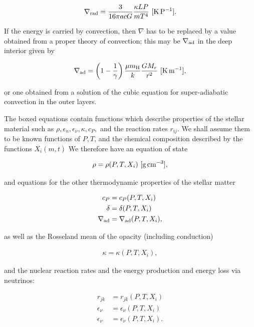 \documentclass[a4paper,10pt]{article}
\begin{document}
\begin{align*}
    \nabla_{\rm rad} = \frac{3}{16\pi acG}\frac{\kappa LP}{mT^4} ~ [{\rm K\,P^{-1}}].
\end{align*}

{\noindent}If the energy is carried by convection, then $\nabla$ has to be replaced by a value obtained from a proper theory of convection; this may be $\nabla_{\rm ad}$ in the deep interior given by 

\begin{align*}
    \nabla_{\rm ad} = \left(1-\frac{1}{\gamma}\right) \frac{\mu m_{\rm H}}{k}\frac{GM_r}{r^2} ~ [{\rm K\,m^{-1}}],
\end{align*}

{\noindent}or one obtained from a solution of the cubic equation for super-adiabatic convection in the outer layers.

{\noindent}The boxed equations contain functions which describe properties of the stellar material such as $\rho, \epsilon_n, \epsilon_\nu,\kappa,c_P,$ and the reaction rates $r_{ij}$. We shall assume them to be known functions of $P, T$, and the chemical composition described by the functions $X_i(m,t)$ We therefore have an equation of state

\begin{align*}
    \rho = \rho(P,T,X_i) ~ [{\rm g\,cm^{-3}}],
\end{align*}

{\noindent}and equations for the other thermodynamic properties of the stellar matter

\begin{align*}
    c_P &= c_P (P,T,X_i) \\
    \delta &= \delta (P,T,X_i) \\
    \nabla_{\rm ad} &= \nabla_{\rm ad} (P,T,X_i),
\end{align*}

{\noindent}as well as the Rosseland mean of the opacity (including conduction)

\begin{align*}
    \kappa = \kappa (P,T,X_i),
\end{align*}

{\noindent}and the nuclear reaction rates and the energy production and energy loss via neutrinos:

\begin{align*}
    r_{jk} &= r_{jk} (P,T,X_i) \\
    \epsilon_\nu &= \epsilon_\nu (P,T,X_i) \\
    \epsilon_\nu &= \epsilon_\nu (P,T,X_i).
\end{align*}
\end{document}
